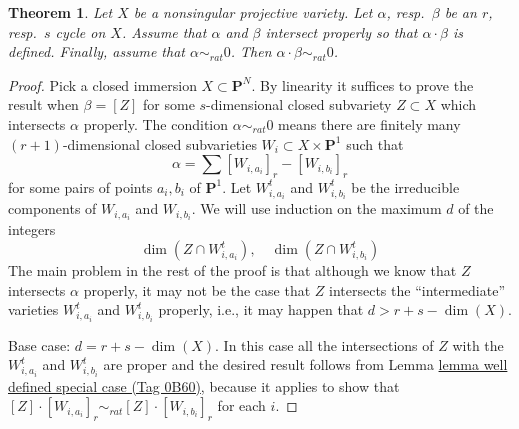 \documentclass{amsart}
\theoremstyle{plain}
\newtheorem{theorem}[subsection]{Theorem}
\theoremstyle{definition}
\theoremstyle{remark}
\numberwithin{equation}{subsection}
\begin{document}
\begin{theorem}
\label{theorem-well-defined}
Let $X$ be a nonsingular projective variety. Let $\alpha$, resp.\ $\beta$
be an $r$, resp.\ $s$ cycle on $X$. Assume that $\alpha$ and $\beta$
intersect properly so that $\alpha \cdot \beta$ is defined. Finally,
assume that $\alpha \sim_{rat} 0$. Then $\alpha \cdot \beta \sim_{rat} 0$.
\end{theorem}

\begin{proof}
Pick a closed immersion $X \subset \mathbf{P}^N$.
By linearity it suffices to prove the result when $\beta = [Z]$ for some
$s$-dimensional closed subvariety $Z \subset X$ which intersects $\alpha$
properly. The condition $\alpha \sim_{rat} 0$ means there
are finitely many $(r + 1)$-dimensional closed subvarieties
$W_i \subset X \times \mathbf{P}^1$ such that
$$
\alpha = \sum [W_{i, a_i}]_r - [W_{i, b_i}]_r
$$
for some pairs of points $a_i, b_i$ of $\mathbf{P}^1$.
Let $W_{i, a_i}^t$ and $W_{i, b_i}^t$ be the irreducible components
of $W_{i, a_i}$ and $W_{i, b_i}$.
We will use induction on the maximum $d$ of the integers
$$
\dim(Z \cap W_{i, a_i}^t),\quad \dim(Z \cap W_{i, b_i}^t)
$$
The main problem in the rest of the proof is that although we know that $Z$
intersects $\alpha$ properly, it may not be the case that $Z$ intersects the
``intermediate'' varieties $W_{i, a_i}^t$
and $W_{i, b_i}^t$ properly, i.e., it may happen that $d >  r + s - \dim(X)$.

\medskip\noindent
Base case: $d = r + s - \dim(X)$. In this case all the intersections of
$Z$ with the $W_{i, a_i}^t$ and $W_{i, b_i}^t$ are proper and the
desired result follows from Lemma \href{https://stacks.math.columbia.edu/tag/0B60}{lemma well defined special case (Tag 0B60)},
because it applies to show that
$[Z] \cdot [W_{i, a_i}]_r \sim_{rat} [Z] \cdot [W_{i, b_i}]_r$ for
each $i$.


\end{proof}
\end{document}
